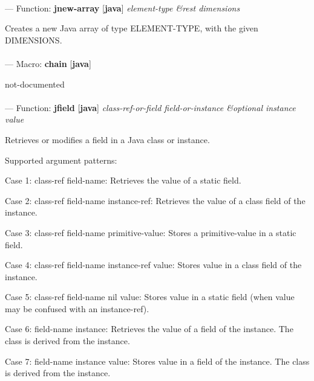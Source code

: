 \paragraph{}
\label{JAVA:JNEW-ARRAY}
--- Function: \textbf{jnew-array} [\textbf{java}] \textit{element-type \&rest dimensions}

\begin{adjustwidth}{5em}{5em}
Creates a new Java array of type ELEMENT-TYPE, with the given DIMENSIONS.
\end{adjustwidth}

\paragraph{}
\label{JAVA:CHAIN}
--- Macro: \textbf{chain} [\textbf{java}] \textit{}

\begin{adjustwidth}{5em}{5em}
not-documented
\end{adjustwidth}

\paragraph{}
\label{JAVA:JFIELD}
--- Function: \textbf{jfield} [\textbf{java}] \textit{class-ref-or-field field-or-instance \&optional instance value}

\begin{adjustwidth}{5em}{5em}
Retrieves or modifies a field in a Java class or instance.

Supported argument patterns:

   Case 1: class-ref  field-name:
      Retrieves the value of a static field.

   Case 2: class-ref  field-name  instance-ref:
      Retrieves the value of a class field of the instance.

   Case 3: class-ref  field-name  primitive-value:
      Stores a primitive-value in a static field.

   Case 4: class-ref  field-name  instance-ref  value:
      Stores value in a class field of the instance.

   Case 5: class-ref  field-name  nil  value:
      Stores value in a static field (when value may be
      confused with an instance-ref).

   Case 6: field-name  instance:
      Retrieves the value of a field of the instance. The
      class is derived from the instance.

   Case 7: field-name  instance  value:
      Stores value in a field of the instance. The class is
      derived from the instance.


\end{adjustwidth}

